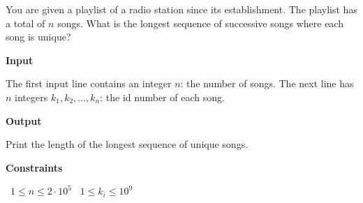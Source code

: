 You are given a playlist of a radio station since its establishment. The playlist has a total of $n$ songs.
What is the longest sequence of successive songs where each song is unique?

\vspace{0.3cm}\noindent\textbf{Input}

The first input line contains an integer $n$: the number of songs.
The next line has $n$ integers $k_1,k_2,\ldots,k_n$: the id number of each song.

\vspace{0.3cm}\noindent\textbf{Output}

Print the length of the longest sequence of unique songs.

\vspace{0.3cm}\noindent\textbf{Constraints}

\textbullet\ $1 \le n \le 2 \cdot 10^5$
\textbullet\ $1 \le k_i \le 10^9$